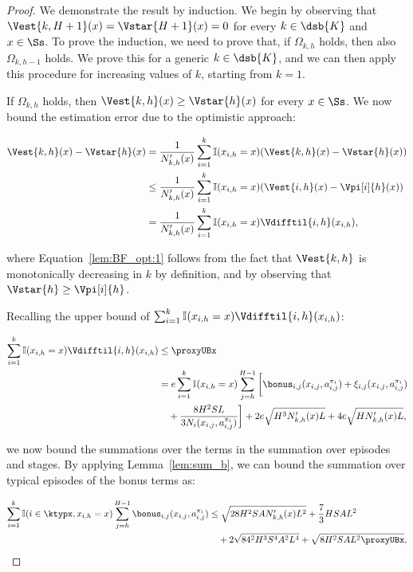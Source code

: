 \begin{proof}
We demonstrate the result by induction. We begin by observing that $\Vest{k, H+1}(x) = \Vstar{H+1}(x) = 0$ for every $k \in \dsb{K}$ and $x \in \Ss$.
To prove the induction, we need to prove that, if $\Omega_{k,h}$ holds, then also $\Omega_{k,h-1}$ holds. We prove this for a generic $k \in \dsb{K}$, and we can then apply this procedure for increasing values of $k$, starting from $k=1$.

If $\Omega_{k,h}$ holds, then $\Vest{k,h}(x) \ge \Vstar{h}(x)$ for every $x \in \Ss$. We now bound the estimation error due to the optimistic approach:

\begin{align}
    \Vest{k,h}(x) - \Vstar{h}(x) &= \frac{1}{N'_{k,h}(x)} \sum_{i=1}^k \mathbb{I}(x_{i,h}=x) (\Vest{k,h}(x) - \Vstar{h}(x)) \nonumber \\
    &\le \frac{1}{N'_{k,h}(x)} \sum_{i=1}^k \mathbb{I}(x_{i,h}=x) (\Vest{i,h}(x) - \Vpi[i]{h}(x)) \label{lem:BF_opt:1} \\
    &= \frac{1}{N'_{k,h}(x)} \sum_{i=1}^k \mathbb{I}(x_{i,h} = x) \Vdifftil{i,h}(x_{i,h}), \label{lem:BF_opt:2}
\end{align}

where Equation~\eqref{lem:BF_opt:1} follows from the fact that $\Vest{k,h}$ is monotonically decreasing in $k$ by definition, and by observing that $\Vstar{h} \ge \Vpi[i]{h}$.

Recalling the upper bound of $\sum_{i=1}^k \mathbb{I}(x_{i,h} = x) \Vdifftil{i,h}(x_{i,h})$:

\begin{align}
    \sum_{i=1}^k \mathbb{I}(x_{i,h} = x) \Vdifftil{i,h}(x_{i,h}) &\le \proxyUBx \nonumber \\
    &= e \sum_{i=1}^k \mathbb{I}(x_{i,h} = x) \sum_{j=h}^{H-1} \bigg[ \bonus_{i,j}(x_{i,j},a_{i,j}^{\pi_i}) + \xi_{i,j} (x_{i,j}, a_{i,j}^{\pi_i}) \nonumber \\ 
    &\quad + \frac{8H^2SL}{3 N_i (x_{i,j}, a_{i,j}^{\pi_i})} \bigg] + 2e\sqrt{H^3 N'_{k,h}(x) L} + 4e\sqrt{H N'_{k,h}(x) L}, \nonumber
\end{align}

we now bound the summations over the terms in the summation over episodes and stages. By applying Lemma~\ref{lem:sum_b}, we can bound the summation over typical episodes of the bonus terms as:

\begin{align*}
    \sum_{i=1}^k \mathbb{I}(i \in \ktypx, x_{i,h}=x) \sum_{j=h}^{H-1} \bonus_{i,j}(x_{i,j}, a_{i,j}^{\pi_i}) &\le \sqrt{28 H^2SA N'_{k,h}(x) L^2} + \frac{7}{3} HSAL^2 \\
    &\quad + 2 \sqrt{84^2 H^3 S^4 A^2 L^4} + \sqrt{8 H^2 SAL^2 \proxyUBx},
\end{align*}


\end{proof}
